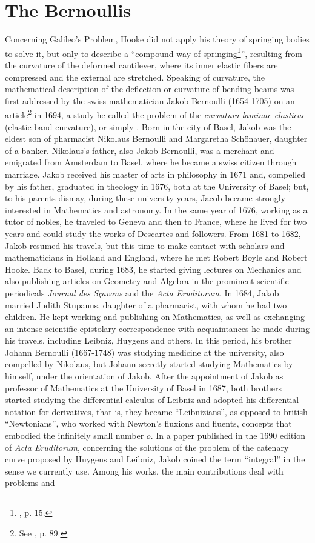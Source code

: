 \section{The Bernoullis}

Concerning Galileo's Problem, Hooke did not apply his theory of springing bodies to solve it, but only to describe a ``compound way of springing\footnote{\cite{hooke_1678_1}, p. 15.}'', resulting from the curvature of the deformed cantilever, where its inner elastic fibers are compressed and the external are stretched. Speaking of curvature, the mathematical description of the deflection or curvature of bending beams was first addressed by the swiss mathematician Jakob Bernoulli (1654-1705) on an article\footnote{See \cite{truesdell_1960}, p. 89.} in 1694, a study he called the problem of the \emph{curvatura laminae elasticae} (elastic band curvature), or simply . Born in the city of Basel, Jakob was the eldest son of pharmacist Nikolaus Bernoulli and Margaretha Sch\"onauer, daughter of a banker. Nikolaus's father, also Jakob Bernoulli, was a merchant and emigrated from Amsterdam to Basel, where he became a swiss citizen through marriage. Jakob received his master of arts in philosophy in 1671 and, compelled by his father, graduated in theology in 1676, both at the University of Basel; but, to his parents dismay, during these university years, Jacob became strongly interested in Mathematics and astronomy. In the same year of 1676, working as a tutor of nobles, he traveled to Geneva and then to France, where he lived for two years and could study the works of Descartes and followers. From 1681 to 1682, Jakob resumed his travels, but this time to make contact with scholars and mathematicians in Holland and England, where he met Robert Boyle and Robert Hooke. Back to Basel, during 1683, he started giving lectures on Mechanics and also publishing articles on Geometry and Algebra in the prominent scientific periodicals \emph{Journal des S\c{c}avans} and the \emph{Acta Eruditorum}. In 1684, Jakob married Judith Stupanus, daughter of a pharmacist, with whom he had two children. He kept working and publishing on Mathematics, as well as exchanging an intense scientific epistolary correspondence with acquaintances he made during his travels, including Leibniz, Huygens and others. In this period, his brother Johann Bernoulli (1667-1748) was studying medicine at the university, also compelled by Nikolaus, but Johann secretly started studying Mathematics by himself, under the orientation of Jakob. After the appointment of Jakob as professor of Mathematics at the University of Basel in 1687, both brothers started studying the differential calculus of Leibniz and adopted his differential notation for derivatives, that is, they became ``Leibnizians'', as opposed to british ``Newtonians'', who worked with Newton's fluxions and fluents, concepts that embodied the infinitely small number $o$. In a paper published in the 1690 edition of \emph{Acta Eruditorum}, concerning the solutions of the problem of the catenary curve proposed by Huygens and Leibniz, Jakob coined the term ``integral'' in the sense we currently use. Among his works, the main contributions deal with problems and 